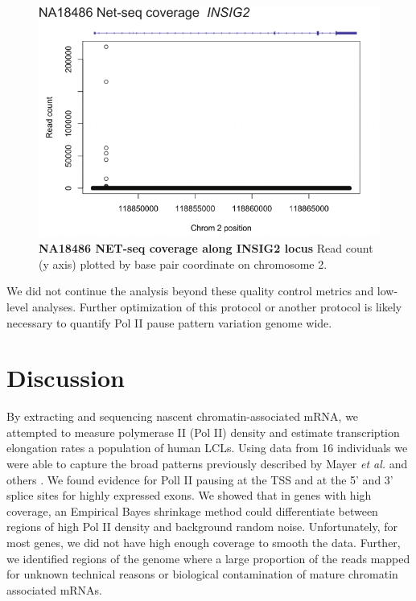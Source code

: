 \begin{figure}
\centering \includegraphics[trim=0 .3in 0
  0,clip,width=5in]{img/ch04/Figure5.pdf}
\caption[NA18486 NET-seq coverage along INSIG2 locus]{\textbf{NA18486 NET-seq coverage along INSIG2 locus} Read count (y axis) plotted by base pair coordinate on chromosome 2.}
\label{fig:insig}
\end{figure}

We did not continue the analysis beyond these quality control metrics and low-level analyses. Further optimization of this protocol or another protocol is likely necessary to quantify Pol II pause pattern variation genome wide. 



\section{Discussion}\label{ch04-discussion}


By extracting and sequencing nascent chromatin-associated mRNA, we attempted to measure polymerase II (Pol II) density and estimate transcription elongation rates a population of human LCLs. Using data from 16 individuals we were able to capture the broad patterns previously described by Mayer \emph{et al.} and others \cite{mayer_native_2015}. We found evidence for Poll II pausing at the TSS and at the 5' and 3' splice sites for highly expressed exons. We showed that in genes with high coverage, an Empirical Bayes shrinkage method could differentiate between regions of high Pol II density and background random noise. Unfortunately, for most genes, we did not have high enough coverage to smooth the data. Further, we identified regions of the genome where a large proportion of the reads mapped for unknown technical reasons or biological contamination of mature chromatin associated mRNAs.


